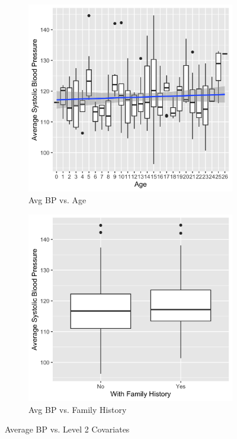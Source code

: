 \documentclass[12pt,twoside,letterpaper]{article}
\theoremstyle{definition}
\theoremstyle{definition}
\begin{document}
\begin{figure}  \ContinuedFloat
    \centering
    \begin{subfigure}{0.48\textwidth}
        \centering
        \includegraphics[width=\textwidth]{pics/bp v age.png}
        \caption{{\small Avg BP vs. Age}}
        \label{fig: bp v age}
    \end{subfigure}
    \hfill
    \begin{subfigure}{0.48\textwidth}
        \centering
        \includegraphics[width=\textwidth]{pics/bp v fh.png}
        \caption{{\small Avg BP vs. Family History}}
        \label{fig: bp v fh}
    \end{subfigure}
    \caption{{\small Average BP vs. Level 2 Covariates}}
    \label{fig: bp v level2 2}
\end{figure}
\end{document}
